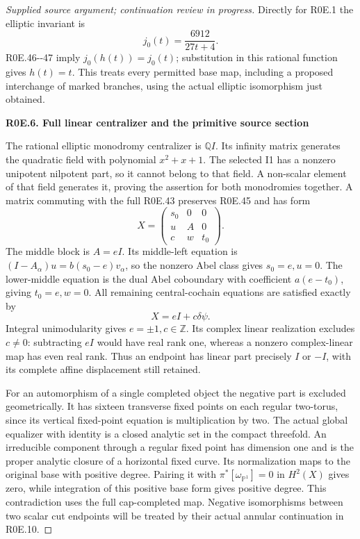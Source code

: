 \begin{proof}[Supplied source argument; continuation review in progress]
Directly for R0E.1 the elliptic invariant is
\[
                         j_0(t)=\frac{6912}{27t+4}.
 \tag{R0E.48}
\]
R0E.46-\/-47 imply \(j_0(h(t))=j_0(t)\); substitution in this rational
function gives \(h(t)=t\). This treats every permitted base map,
including a proposed interchange of marked branches, using the actual
elliptic isomorphism just obtained.

\par

\medskip\noindent\textbf{R0E.6. Full linear centralizer and the primitive source section}

\par\nobreak

The rational elliptic monodromy centralizer is \(\mathbb QI\).
Its infinity matrix generates the quadratic field with polynomial
\(x^2+x+1\). The selected I1 has a nonzero unipotent nilpotent part,
so it cannot belong to that field. A non-scalar element of that field
generates it, proving the assertion for both monodromies together.
A matrix commuting with the full R0E.43 preserves R0E.45 and has form
\[
 X=\begin{pmatrix}s_0&0&0\\u&A&0\\c&w&t_0\end{pmatrix}.
\]
The middle block is \(A=eI\). Its middle-left equation is
\((I-A_\alpha)u=b(s_0-e)v_\alpha\), so the nonzero Abel class gives
\(s_0=e,u=0\). The lower-middle equation is the dual Abel coboundary
with coefficient \(a(e-t_0)\), giving \(t_0=e,w=0\). All remaining
central-cochain equations are satisfied exactly by
\[
                             X=eI+c\delta\psi.
 \tag{R0E.49}
\]
Integral unimodularity gives \(e=\pm1,c\in\mathbb Z\). Its complex
linear realization excludes \(c\ne0\): subtracting \(eI\) would
have real rank one, whereas a nonzero complex-linear map has even
real rank. Thus an endpoint has linear part precisely \(I\) or
\(-I\), with its complete affine displacement still retained.

For an automorphism of a single completed object the negative part
is excluded geometrically. It has sixteen transverse fixed points
on each regular two-torus, since its vertical fixed-point equation
is multiplication by two. The actual global equalizer with identity
is a closed analytic set in the compact threefold. An irreducible
component through a regular fixed point has dimension one and is the
proper analytic closure of a horizontal fixed curve. Its normalization
maps to the original base with positive degree. Pairing it with
\(\pi^*[\omega_{\mathbb P^1}]=0\) in \(H^2(X)\) gives zero, while
integration of this positive base form gives positive degree. This
contradiction uses the full cap-completed map. Negative isomorphisms
between two scalar cut endpoints will be treated by their actual
annular continuation in R0E.10.


\end{proof}
